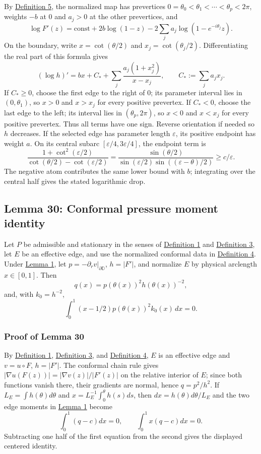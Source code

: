 \documentclass[11pt]{article}
\begin{document}
By \hyperref[def-turn-measure]{Definition 5}, the normalized map has
prevertices \(0=\theta_0<\theta_1<\cdots<\theta_p<2\pi\), weights \(-b\)
at \(0\) and \(a_j>0\) at the other prevertices, and \[
\log F'(z)=\mathrm{const}+2b\log(1-z)-2\sum_j a_j\log(1-e^{-i\theta_j}z).
\] On the boundary, write \(x=\cot(\theta/2)\) and
\(x_j=\cot(\theta_j/2)\). Differentiating the real part of this formula
gives \[
(\log h)'=bx+C_*+\sum_j\frac{a_j(1+x_j^2)}{x-x_j},
\qquad C_*:=\sum_ja_jx_j.
\] If \(C_*\ge0\), choose the first edge to the right of \(0\); its
parameter interval lies in \((0,\theta_1)\), so \(x>0\) and \(x>x_j\)
for every positive prevertex. If \(C_*<0\), choose the last edge to the
left; its interval lies in \((\theta_p,2\pi)\), so \(x<0\) and \(x<x_j\)
for every positive prevertex. Thus all terms have one sign. Reverse
orientation if needed so \(h\) decreases. If the selected edge has
parameter length \(\varepsilon\), its positive endpoint has weight
\(a\). On its central subarc \([\varepsilon/4,3\varepsilon/4]\), the
endpoint term is \[
\frac{1+\cot^2(\varepsilon/2)}{\cot(\theta/2)-\cot(\varepsilon/2)}
=\frac{\sin(\theta/2)}{\sin(\varepsilon/2)\sin((\varepsilon-\theta)/2)}\ge c/\varepsilon.
\] The negative atom contributes the same lower bound with \(b\);
integrating over the central half gives the stated logarithmic drop.

\subsection{Lemma 30: Conformal pressure moment
identity}\label{lem-physical-pressure-moment}

Let \(P\) be admissible and stationary in the senses of
\hyperref[def-admissible-polygon]{Definition 1} and
\hyperref[def-stationary-polygon]{Definition 3}, let \(E\) be an
effective edge, and use the normalized conformal data in
\hyperref[def-conformal-data]{Definition 4}. Under
\hyperref[lem-edge-moments]{Lemma 1}, let
\(p=-\partial_rv|_{\partial\mathbb D}\), \(h=|F'|\), and normalize \(E\)
by physical arclength \(x\in[0,1]\). Then \[
q(x)=p(\theta(x))^2h(\theta(x))^{-2},
\] and, with \(k_0=h^{-2}\), \[
\int_0^1(x-1/2)p(\theta(x))^2k_0(x)\,dx=0.
\]

\subsubsection{Proof of Lemma
30}\label{proof-lem-physical-pressure-moment}

By \hyperref[def-admissible-polygon]{Definition 1},
\hyperref[def-stationary-polygon]{Definition 3}, and
\hyperref[def-conformal-data]{Definition 4}, \(E\) is an effective edge
and \(v=u\circ F\), \(h=|F'|\). The conformal chain rule gives
\(|\nabla u(F(z))|=|\nabla v(z)|/|F'(z)|\) on the relative interior of
\(E\); since both functions vanish there, their gradients are normal,
hence \(q=p^2/h^2\). If \(L_E=\int h(\theta)d\theta\) and
\(x=L_E^{-1}\int_0^\theta h(s)ds\), then \(dx=h(\theta)d\theta/L_E\) and
the two edge moments in \hyperref[lem-edge-moments]{Lemma 1} become \[
\int_0^1(q-c)dx=0,
\qquad \int_0^1x(q-c)dx=0.
\] Subtracting one half of the first equation from the second gives the
displayed centered identity.
\end{document}
